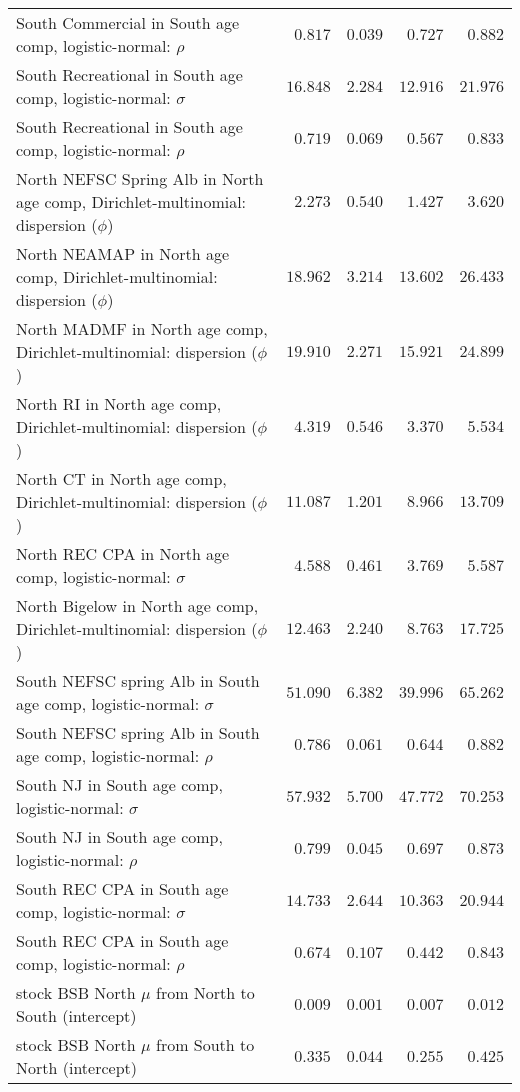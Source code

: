 \documentclass[
]{article}
\begin{document}
\begin{landscape}
\begin{longtable}[t]{lrrrr}
South Commercial in South age comp, logistic-normal: $\rho$ & $0.817$ & $0.039$ & $0.727$ & $0.882$\\
\addlinespace
South Recreational in South age comp, logistic-normal: $\sigma$ & $16.848$ & $2.284$ & $12.916$ & $21.976$\\
South Recreational in South age comp, logistic-normal: $\rho$ & $0.719$ & $0.069$ & $0.567$ & $0.833$\\
North NEFSC Spring Alb in North age comp, Dirichlet-multinomial: dispersion ($\phi$) & $2.273$ & $0.540$ & $1.427$ & $3.620$\\
North NEAMAP in North age comp, Dirichlet-multinomial: dispersion ($\phi$) & $18.962$ & $3.214$ & $13.602$ & $26.433$\\
North MADMF in North age comp, Dirichlet-multinomial: dispersion ($\phi$) & $19.910$ & $2.271$ & $15.921$ & $24.899$\\
\addlinespace
North RI in North age comp, Dirichlet-multinomial: dispersion ($\phi$) & $4.319$ & $0.546$ & $3.370$ & $5.534$\\
North CT in North age comp, Dirichlet-multinomial: dispersion ($\phi$) & $11.087$ & $1.201$ & $8.966$ & $13.709$\\
North REC CPA in North age comp, logistic-normal: $\sigma$ & $4.588$ & $0.461$ & $3.769$ & $5.587$\\
North Bigelow in North age comp, Dirichlet-multinomial: dispersion ($\phi$) & $12.463$ & $2.240$ & $8.763$ & $17.725$\\
South NEFSC spring Alb in South age comp, logistic-normal: $\sigma$ & $51.090$ & $6.382$ & $39.996$ & $65.262$\\
\addlinespace
South NEFSC spring Alb in South age comp, logistic-normal: $\rho$ & $0.786$ & $0.061$ & $0.644$ & $0.882$\\
South NJ in South age comp, logistic-normal: $\sigma$ & $57.932$ & $5.700$ & $47.772$ & $70.253$\\
South NJ in South age comp, logistic-normal: $\rho$ & $0.799$ & $0.045$ & $0.697$ & $0.873$\\
South REC CPA in South age comp, logistic-normal: $\sigma$ & $14.733$ & $2.644$ & $10.363$ & $20.944$\\
South REC CPA in South age comp, logistic-normal: $\rho$ & $0.674$ & $0.107$ & $0.442$ & $0.843$\\
\addlinespace
stock BSB North $\mu$ from North to South (intercept) & $0.009$ & $0.001$ & $0.007$ & $0.012$\\
stock BSB North $\mu$ from South to North (intercept) & $0.335$ & $0.044$ & $0.255$ & $0.425$\\

\end{longtable}
\end{landscape}
\end{document}
